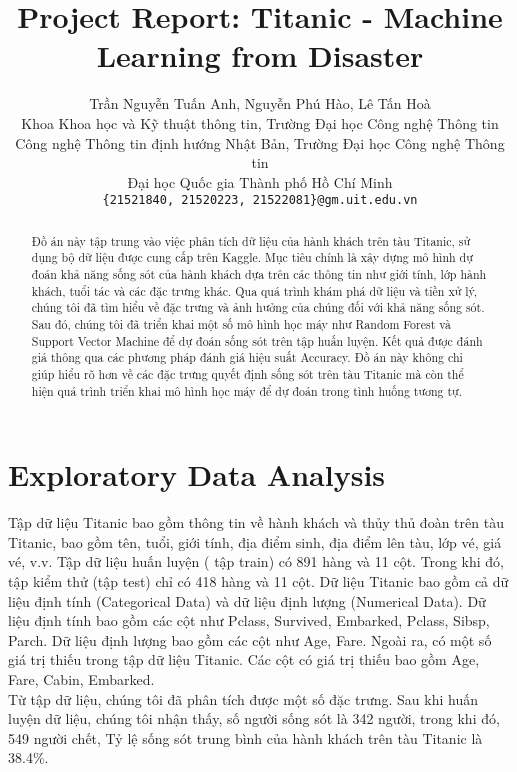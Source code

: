 \documentclass[11pt]{article}
\title{Project Report: Titanic - Machine Learning from Disaster}
\author{
Trần Nguyễn Tuấn Anh, Nguyễn Phú Hào, Lê Tấn Hoà\\
Khoa Khoa học và Kỹ thuật thông tin, Trường Đại học Công nghệ Thông tin \\
Công nghệ Thông tin định hướng Nhật Bản, Trường Đại học Công nghệ Thông tin \\
Đại học Quốc gia Thành phố Hồ Chí Minh \\
\texttt{\{21521840, 21520223, 21522081\}@gm.uit.edu.vn}
}
\begin{document}
\maketitle

\begin{abstract}
Đồ án này tập trung vào việc phân tích dữ liệu của hành khách trên tàu Titanic, sử dụng bộ dữ liệu được cung cấp trên Kaggle. Mục tiêu chính là xây dựng mô hình dự đoán khả năng sống sót của hành khách dựa trên các thông tin như giới tính, lớp hành khách, tuổi tác và các đặc trưng khác. Qua quá trình khám phá dữ liệu và tiền xử lý, chúng tôi đã tìm hiểu về đặc trưng và ảnh hưởng của chúng đối với khả năng sống sót. Sau đó, chúng tôi đã triển khai một số mô hình học máy như Random Forest và Support Vector Machine để dự đoán sống sót trên tập huấn luyện. Kết quả được đánh giá thông qua các phương pháp đánh giá hiệu suất Accuracy. Đồ án này không chỉ giúp hiểu rõ hơn về các đặc trưng quyết định sống sót trên tàu Titanic mà còn thể hiện quá trình triển khai mô hình học máy để dự đoán trong tình huống tương tự.
\end{abstract}

\section{Exploratory Data Analysis}
Tập dữ liệu Titanic bao gồm thông tin về hành khách và thủy thủ đoàn trên tàu Titanic, bao gồm tên, tuổi, giới tính, địa điểm sinh, địa điểm lên tàu, lớp vé, giá vé, v.v. Tập dữ liệu huấn luyện ( tập train) có 891 hàng và 11 cột. Trong khi đó, tập kiểm thử (tập test) chỉ có 418 hàng và 11 cột. Dữ liệu Titanic bao gồm cả dữ liệu định tính (Categorical Data) và dữ liệu định lượng (Numerical Data). Dữ liệu định tính bao gồm các cột như Pclass, Survived, Embarked, Pclass, Sibsp, Parch. Dữ liệu định lượng bao gồm các cột như Age, Fare. Ngoài ra, có một số giá trị thiếu trong tập dữ liệu Titanic. Các cột có giá trị thiếu bao gồm Age, Fare, Cabin, Embarked.\\
Từ tập dữ liệu, chúng tôi đã phân tích được một số đặc trưng. Sau khi huấn luyện dữ liệu, chúng tôi nhận thấy, số người sống sót là 342 người, trong khi đó, 549 người chết, Tỷ lệ sống sót trung bình của hành khách trên tàu Titanic là 38.4\%.
\end{document}
